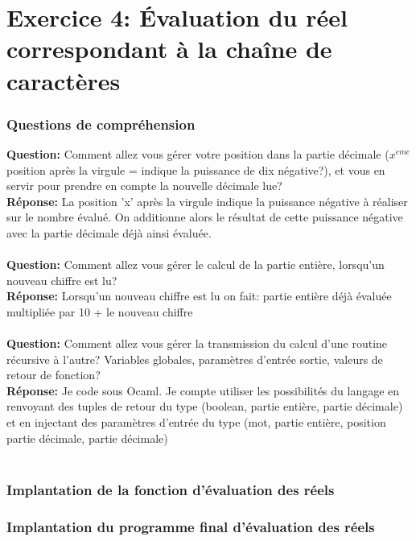 \documentclass[./standalone.tex]{subfiles}
\begin{document}
\section{Exercice 4: Évaluation du réel correspondant à la chaîne de caractères}
\bigskip

\subsubsection{Questions de compréhension}
\medskip

\textbf{Question:} Comment allez vous gérer votre position dans la partie décimale ($x^{eme}$ position après la virgule = indique la puissance de dix négative?), et vous en servir pour prendre en compte la nouvelle décimale lue? \\

\textbf{Réponse:} La position 'x' après la virgule indique la puissance négative à réaliser sur le nombre évalué. On additionne alors le résultat de cette puissance négative avec la partie décimale déjà ainsi évaluée.\\\\


\textbf{Question:} Comment allez vous gérer le calcul de la partie entière, lorsqu'un nouveau chiffre est lu? \\

\textbf{Réponse:} Lorsqu'un nouveau chiffre est lu on fait: partie entière déjà évaluée multipliée par 10 + le nouveau chiffre\\\\

\textbf{Question:} Comment allez vous gérer la transmission du calcul d'une routine récursive à l'autre? Variables globales, paramètres d'entrée sortie, valeurs de retour de fonction?\\

\textbf{Réponse:} Je code sous Ocaml. Je compte utiliser les possibilités du langage en renvoyant des tuples de retour du type (boolean, partie entière, partie décimale) et en injectant des paramètres d'entrée du type (mot, partie entière, position partie décimale, partie décimale)\\\\

\subsubsection{Implantation de la fonction d'évaluation des réels}


\subsubsection{Implantation du programme final d'évaluation des réels}

\end{document}
